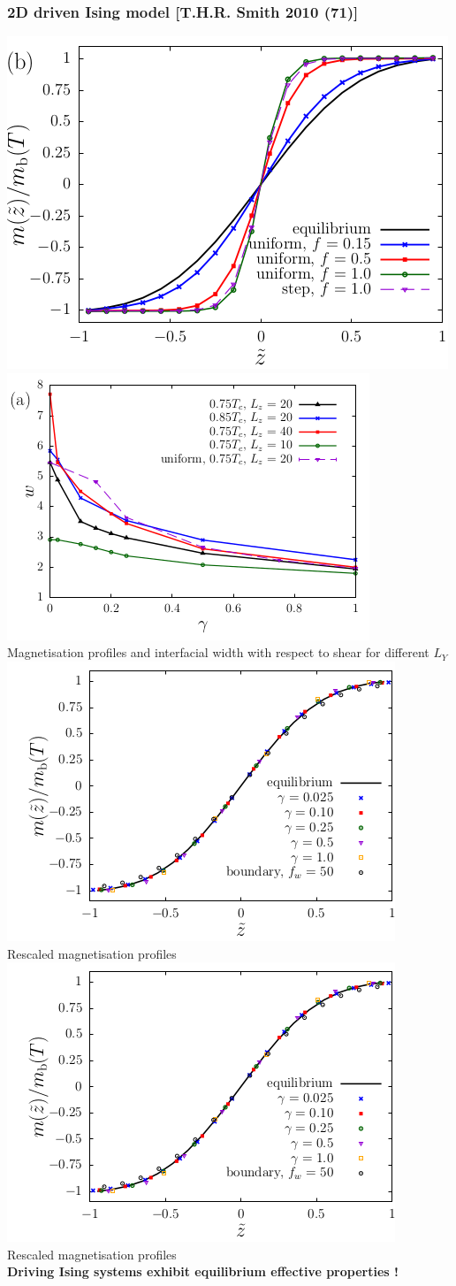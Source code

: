 \documentclass[9pt, dvipsnames,aspectratio=169]{beamer} %
\begin{document}
\begin{frame}
    \frametitle{2D driven Ising model [T.H.R. Smith 2010 (71)]}
    \begin{overprint}
		\centering
		\includegraphics[width=0.495\linewidth]{smith-mag.png}
		\includegraphics[width=0.495\linewidth]{smith-width.png} 	\\	
	    Magnetisation profiles and interfacial width with respect to shear for different $L_Y$ 
	\onslide<2>
	    \centering
		\includegraphics[width=0.5\linewidth]{smith-rescale.png} \\	    
		{\small Rescaled magnetisation profiles} \\
	\onslide<3>
	    \centering
		\includegraphics[width=0.5\linewidth]{smith-rescale.png} \\	    
		{\small Rescaled magnetisation profiles} \\
		{\Huge \bf Driving Ising systems exhibit equilibrium  effective properties !	    }		
    \end{overprint}       
\end{frame}
\end{document}
